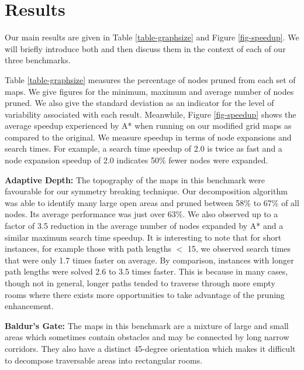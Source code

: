 \section{Results}
\label{sec-results}
Our main results are given in Table \ref{table-graphsize} and
Figure \ref{fig-speedup}.
We will briefly introduce both and then discuss them in the context
of each of our three benchmarks.
\par
Table \ref{table-graphsize} measures the percentage of nodes
pruned from each set of maps.  We give figures for the minimum,
maximum and average number of nodes pruned.  
We also give the standard deviation as an indicator
for the level of variability associated with each result. 
Meanwhile, Figure \ref{fig-speedup} shows the average speedup experienced
by A* when running on our modified grid maps as compared to the
original.  We measure speedup in terms of node expansions and search
times.  For example, a search time speedup of 2.0 is twice as fast and
a node expansion speedup of 2.0 indicates 50\% fewer nodes were expanded.

\textbf{Adaptive Depth:} 
The topography of the maps in this benchmark were favourable for
our symmetry breaking technique.  Our decomposition algorithm was
able to identify many large open areas and pruned between 58\%
to 67\% of all nodes.  Its average performance was just over
63\%.  We also observed up to a factor of 3.5 reduction in the average 
number of nodes expanded by A* and a similar maximum search time speedup.
It is interesting to note that for short instances, for example
those with path lengths $<$ 15, we observed search times that were only 1.7
times faster on average. 
By comparison, instances with
longer path lengths were solved 2.6 to 3.5 times faster.  
This is because in many cases, though not in general, longer paths 
tended to traverse through more empty rooms where there exists more 
opportunities to take advantage of the pruning enhancement.
%
\par
\textbf{Baldur's Gate: }
The maps in this benchmark are a mixture of large and small areas
which sometimes contain obstacles and may be connected by long narrow 
corridors.
They also have a distinct 45-degree orientation which makes
it difficult to decompose traversable areas into rectangular rooms.
